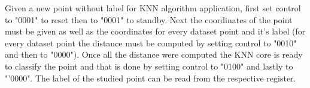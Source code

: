 Given a new point without label for KNN algorithm application, first set control to "0001" to reset then to "0001" to standby. Next the coordinates of the point must be given as well as the coordinates for every dataset point and it's label (for every dataset point the distance must be computed by setting control to "0010" and then to "0000"). Once all the distance were computed the KNN core is ready to classify the point and that is done by setting control to "0100" and lastly to "'0000". The label of the studied point can be read from the respective register.
